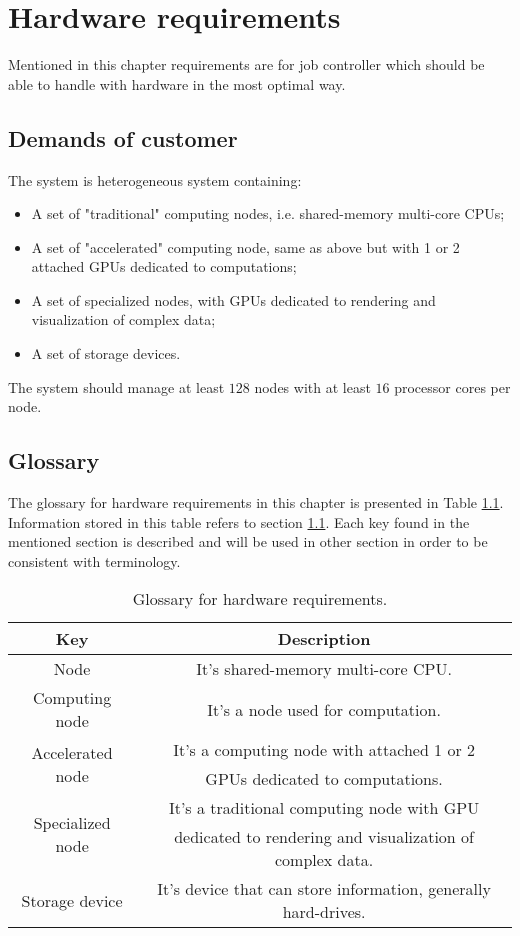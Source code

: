 \chapter{Hardware requirements} \label{sec:hardware_requirements}
	Mentioned in this chapter requirements are for job controller which should be able to handle with hardware in the most optimal way.
	
	\section{Demands of customer}
	\label{sec:hardware_requirements_demands}
		The system is heterogeneous system containing:
		\begin{itemize}
			\item A set of "traditional" computing nodes, i.e. shared-memory multi-core CPUs;
			\item A set of "accelerated" computing node, same as above  but with 1 or 2 attached GPUs dedicated to computations;
			\item A set of specialized nodes, with GPUs dedicated to rendering and visualization of complex data;
			\item A set of storage devices.
		\end{itemize}
		The system should manage at least $128$ nodes with at least $16$ processor cores per node.
	
	\section{Glossary} 
	\label{sec:hardware_requirements_glossary}
		The glossary for hardware requirements in this chapter is presented in Table \ref{tab:hardware_requirements_glossary}. Information stored in this table refers to section \ref{sec:hardware_requirements_demands}. Each key found in the mentioned section is described and will be used in other section in order to be consistent with terminology.
		\begin{table}[!htbp]
			\centering
			\caption{Glossary for hardware requirements.}
			\label{tab:hardware_requirements_glossary}
			\begin{tabular}{|c|c|}
				\hline
				\textbf{Key} & \textbf{Description} \\ \hline \hline
				Node & It's shared-memory multi-core CPU.\\ \hline
				Computing node & It's a node used for computation. \\ \hline
				\multirow{2}{*}{Accelerated node} &  It's a computing node with attached 1 or 2 \\ & GPUs dedicated to computations.\\ \hline
				\multirow{2}{*}{Specialized node} & It's a traditional computing node with GPU \\& dedicated to rendering and visualization of complex data. \\ \hline \hline
				Storage device & It's device that can store information, generally hard-drives. \\ \hline
			\end{tabular}
		\end{table}
	
